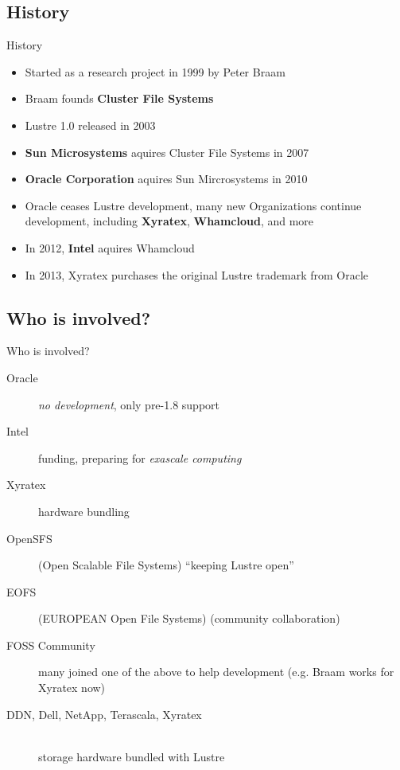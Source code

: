 \subsection{History}
\begin{frame}{History}
    \begin{itemize}
        \item Started as a research project in 1999 by Peter Braam
        \item Braam founds \textbf{Cluster File Systems}
        \item Lustre 1.0 released in 2003
        \item \textbf{Sun Microsystems} aquires Cluster File Systems in 2007
        \item \textbf{Oracle Corporation} aquires Sun Mircrosystems in 2010
        \item Oracle ceases Lustre development, many new Organizations continue
            development, including \textbf{Xyratex},  \textbf{Whamcloud}, and
            more
        \item In 2012, \textbf{Intel} aquires Whamcloud
        \item In 2013, Xyratex purchases the original Lustre trademark from Oracle
    \end{itemize}
\end{frame}

\subsection{Who is involved?}
\begin{frame}{Who is involved?}
    \begin{description}
        \item[Oracle] \emph{no development}, only pre-1.8 support
        \item[Intel] funding, preparing for \emph{exascale computing}
        \item[Xyratex] hardware bundling
        \item[OpenSFS] (Open Scalable File Systems) ``keeping Lustre open''
        \item[EOFS] (EUROPEAN Open File Systems) (community collaboration)
        \item[FOSS Community] many joined one of the above to help development
            (e.g. Braam works for Xyratex now)
        \item[DDN, Dell, NetApp, Terascala, Xyratex]\hfill \\
            storage hardware bundled with Lustre
    \end{description}
\end{frame}

